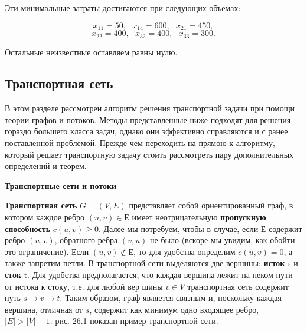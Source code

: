 \documentclass[a4paper,12pt]{article}
\begin{document}
	Эти минимальные затраты достигаются при следующих объемах:
	
	\[
		x_{11} = 50, \ \ \ x_{14} = 600, \ \ \ x_{21} = 450,
	\]
	\[
		x_{22} = 400, \ \ \ x_{32} = 400, \ \ \ x_{33} = 300.
	\]
	
	Остальные неизвестные оставляем равны нулю.
	\clearpage

	\subsection{Транспортная сеть}
	
	В этом разделе рассмотрен алгоритм решения транспортной задачи при помощи теории графов и потоков. Методы представленные ниже подходят для решения гораздо большего класса задач, однако они эффективно справляются и с ранее поставленной проблемой. Прежде чем переходить на прямою к алгоритму, который решает транспортную задачу стоить рассмотреть пару дополнительных определений и теорем.
	
	\textbf{Транспортные сети и потоки}
	
	\textbf{Транспортная сеть} $G = (V, E)$ представляет собой ориентированный граф, в котором каждое ребро $(u, v) \in Е$ имеет неотрицательную \textbf{ пропускную способность} $c(u,v) \geqslant 0$. Далее мы потребуем, чтобы в случае, если $Е$ содержит ребро $(u,v)$, обратного ребра $(v,u)$ не было (вскоре мы	увидим, как обойти это ограничение). Если $(u,v) \notin Е$, то для удобства определим $c(u,v) = 0$, а также запретим петли. В транспортной сети выделяются две вершины: \textbf{исток} s и \textbf{сток} t. Для удобства предполагается, что каждая вершина лежит на неком пути от истока к стоку, т.е. для любой вер	шины $v \in V$ транспортная сеть содержит путь $s \longrightarrow v \longrightarrow t$. Таким образом, граф является связным и, поскольку каждая вершина, отличная от $s$, содержит как минимум одно входящее ребро, $|E| > |V| - 1$. рис. 26.1 показан пример транспортной сети.
\end{document}

